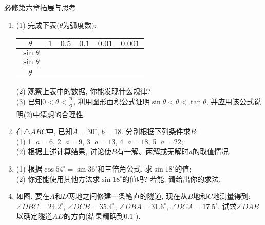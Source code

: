 \documentclass[10pt,a4paper]{article}
\begin{document}
必修第六章拓展与思考
\begin{enumerate}[1.]

\item (1) 完成下表($\theta$为弧度数):
\begin{center}
\begin{tabular}{|c|p{}<{\centering}|p{}<{\centering}|p{}<{\centering}|p{}<{\centering}|p{}<{\centering}|}
    \hline
    $\theta$ & $1$ & $0.5$ & $0.1$ & $0.01$ & $0.001$\\ \hline
    $\sin\theta$ & & & & &\\ \hline
    $\dfrac{\sin\theta}{\theta}$ & & & & &\\ \hline
\end{tabular}
\end{center}
(2) 观察上表中的数据, 你能发现什么规律?\\
(3) 已知$0<\theta <\dfrac \pi 2$, 利用图形面积公式证明$\sin \theta <\theta <\tan \theta$, 并应用该公式说明(2)中猜想的合理性.
\vspace*{3cm}
\item 在$\triangle ABC$中, 已知$A=30^\circ$, $b=18$. 分别根据下列条件求$B$:\\
(1) \textcircled{1} $a=6$, \textcircled{2} $a=9$, \textcircled{3} $a=13$, \textcircled{4} $a=18$, \textcircled{5} $a=22$;\\
(2) 根据上述计算结果, 讨论使$B$有一解、两解或无解时$a$的取值情况.
\vspace*{3cm}
\item (1) 根据$\cos 54^\circ=\sin 36^\circ$和三倍角公式, 求$\sin 18^\circ$的值;\\
(2) 你还能使用其他方法求$\sin 18^\circ$的值吗? 若能, 请给出你的求法.
\vspace*{3cm}
\item 如图, 要在$A$和$D$两地之间修建一条笔直的隧道, 现在从$B$地和$C$地测量得到: $\angle DBC=24.2^\circ$, $\angle DCB=35.4^\circ$, $\angle DBA=31.6^\circ$, $\angle DCA=17.5^\circ$. 试求$\angle DAB$以确定隧道$AD$的方向(结果精确到$0.1^\circ$).
\begin{center}
\end{center}
\vspace*{3cm}
\end{enumerate}
\end{document}
